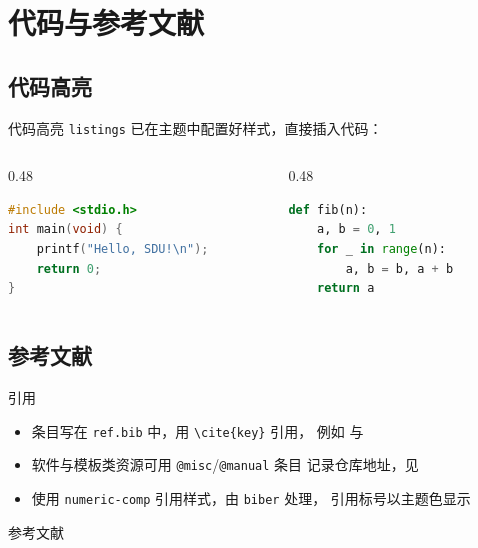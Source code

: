 \documentclass[aspectratio=169]{beamer}
\begin{document}
\section{代码与参考文献}

\subsection{代码高亮}

\begin{frame}[fragile]{代码高亮}
    \texttt{listings} 已在主题中配置好样式，直接插入代码：
    \begin{columns}
        \begin{column}{0.48\textwidth}
            \begin{lstlisting}[language=C]
#include <stdio.h>
int main(void) {
    printf("Hello, SDU!\n");
    return 0;
}
\end{lstlisting}
        \end{column}
        \begin{column}{0.48\textwidth}
            \begin{lstlisting}[language=Python]
def fib(n):
    a, b = 0, 1
    for _ in range(n):
        a, b = b, a + b
    return a
\end{lstlisting}
        \end{column}
    \end{columns}
\end{frame}

\subsection{参考文献}

\begin{frame}{引用}
    \begin{itemize}
        \item 条目写在 \texttt{ref.bib} 中，用
              \texttt{\textbackslash cite\{key\}} 引用，
              例如 \cite{texbook} 与 \cite{beamerug}
        \item 软件与模板类资源可用 \texttt{@misc}/\texttt{@manual} 条目
              记录仓库地址，见 \cite{thu,pku,origin,sdulogo}
        \item 使用 \texttt{numeric-comp} 引用样式，由 \texttt{biber} 处理，
              引用标号以主题色显示
    \end{itemize}
\end{frame}

\begin{frame}[allowframebreaks]{参考文献}
    \printbibliography
\end{frame}

\end{document}
